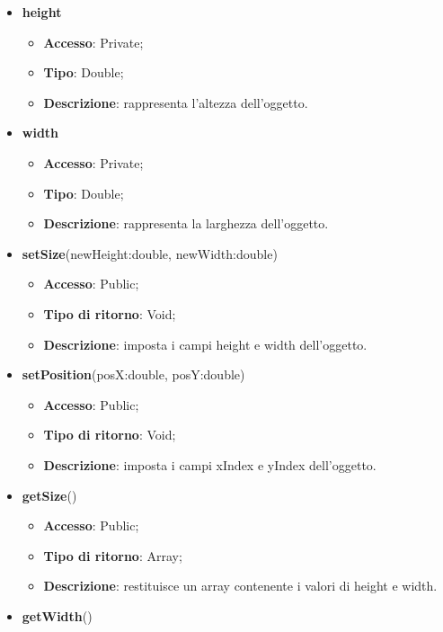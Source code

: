 {\begin{itemize}
\begin{itemize}
			\end{itemize}
			\item \textbf{height}
			\begin{itemize}
				\item \textbf{Accesso}: Private;
				\item \textbf{Tipo}: Double;
				\item \textbf{Descrizione}: rappresenta l’altezza dell’oggetto.
			\end{itemize}
			\item \textbf{width}
			\begin{itemize}
				\item \textbf{Accesso}: Private;
				\item \textbf{Tipo}: Double;
				\item \textbf{Descrizione}: rappresenta la larghezza dell’oggetto.
			\end{itemize}
		\end{itemize}
		\begin{itemize}
			\item \textbf{setSize}(newHeight:double, newWidth:double)
			\begin{itemize}
				\item \textbf{Accesso}: Public;
				\item \textbf{Tipo di ritorno}: Void;
				\item \textbf{Descrizione}: imposta i campi height e width dell’oggetto.
			\end{itemize}
			\item \textbf{setPosition}(posX:double, posY:double)
			\begin{itemize}
				\item \textbf{Accesso}: Public;
				\item \textbf{Tipo di ritorno}: Void;
				\item \textbf{Descrizione}: imposta i campi xIndex e yIndex dell’oggetto.
			\end{itemize}
			\item \textbf{getSize}()
			\begin{itemize}
				\item \textbf{Accesso}: Public;
				\item \textbf{Tipo di ritorno}: Array;
				\item \textbf{Descrizione}: restituisce un array contenente i valori di height e width.
			\end{itemize}
			\item \textbf{getWidth}()

\end{itemize}}
